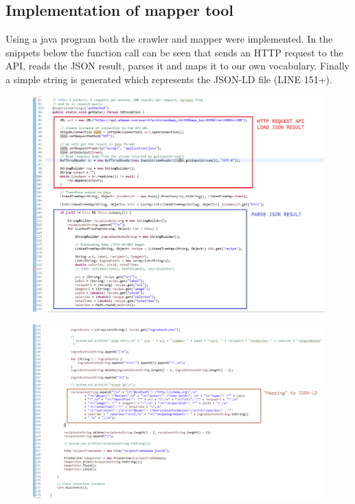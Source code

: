 \documentclass{article}
\begin{document}
\subsection{Implementation of mapper tool}
Using a java program both the crawler and mapper were implemented. In the snippets below the function call can be seen that sends an HTTP request to the API, reads the JSON result, parses it and maps it to our own vocabulary. Finally a simple string is generated which represents the JSON-LD file (LINE 151+).

\begin{figure}[H]
  \centering
  \includegraphics[width=12cm]{pictures/mapping_tool.png}
  \label{fig:maptool}
\end{figure}

\begin{figure}[H]
  \centering
  \includegraphics[width=12cm]{pictures/mapping_tool2.png}
  \label{fig:maptool2}
\end{figure}
\noindent
\end{document}
